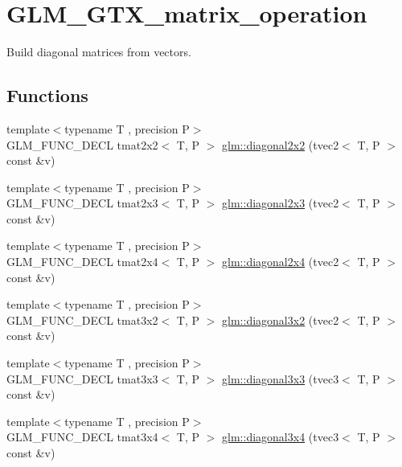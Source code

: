 \hypertarget{group__gtx__matrix__operation}{\section{G\-L\-M\-\_\-\-G\-T\-X\-\_\-matrix\-\_\-operation}
\label{group__gtx__matrix__operation}
}


Build diagonal matrices from vectors.  


\subsection*{Functions}
\begin{DoxyCompactItemize}
\item 
{\footnotesize template$<$typename T , precision P$>$ }\\G\-L\-M\-\_\-\-F\-U\-N\-C\-\_\-\-D\-E\-C\-L tmat2x2$<$ T, P $>$ \hyperlink{group__gtx__matrix__operation_ga01dc503262dba9c457113d131fc8c024}{glm\-::diagonal2x2} (tvec2$<$ T, P $>$ const \&v)
\item 
{\footnotesize template$<$typename T , precision P$>$ }\\G\-L\-M\-\_\-\-F\-U\-N\-C\-\_\-\-D\-E\-C\-L tmat2x3$<$ T, P $>$ \hyperlink{group__gtx__matrix__operation_ga763817f07d6a94b722a48adfa87a35db}{glm\-::diagonal2x3} (tvec2$<$ T, P $>$ const \&v)
\item 
{\footnotesize template$<$typename T , precision P$>$ }\\G\-L\-M\-\_\-\-F\-U\-N\-C\-\_\-\-D\-E\-C\-L tmat2x4$<$ T, P $>$ \hyperlink{group__gtx__matrix__operation_ga49b37c819cf6dd8e35112ed1a13d45a3}{glm\-::diagonal2x4} (tvec2$<$ T, P $>$ const \&v)
\item 
{\footnotesize template$<$typename T , precision P$>$ }\\G\-L\-M\-\_\-\-F\-U\-N\-C\-\_\-\-D\-E\-C\-L tmat3x2$<$ T, P $>$ \hyperlink{group__gtx__matrix__operation_ga586e1ced91fd8a7c414186a200f13532}{glm\-::diagonal3x2} (tvec2$<$ T, P $>$ const \&v)
\item 
{\footnotesize template$<$typename T , precision P$>$ }\\G\-L\-M\-\_\-\-F\-U\-N\-C\-\_\-\-D\-E\-C\-L tmat3x3$<$ T, P $>$ \hyperlink{group__gtx__matrix__operation_ga8e817dba22f2305cdebae07bbbe0360c}{glm\-::diagonal3x3} (tvec3$<$ T, P $>$ const \&v)
\item 
{\footnotesize template$<$typename T , precision P$>$ }\\G\-L\-M\-\_\-\-F\-U\-N\-C\-\_\-\-D\-E\-C\-L tmat3x4$<$ T, P $>$ \hyperlink{group__gtx__matrix__operation_gae3f85af86c18c80f2acbe3223feb8e81}{glm\-::diagonal3x4} (tvec3$<$ T, P $>$ const \&v)

\end{DoxyCompactItemize}
